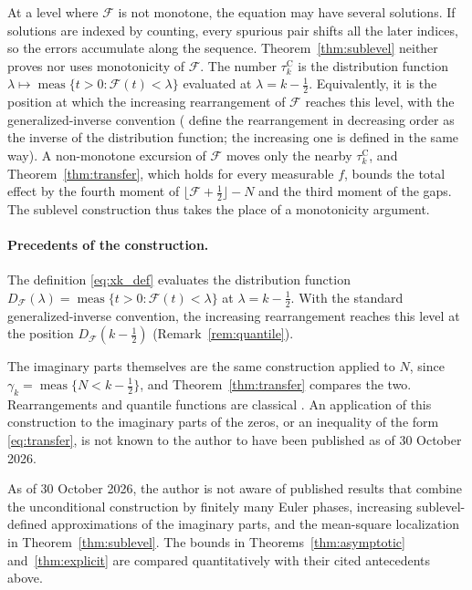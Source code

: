 \documentclass[11pt,a4paper]{article}
\makeatletter
\numberwithin{equation}{section}
\DeclareRobustCommand{\CGref}[1]{\ref{#1}}
\DeclareRobustCommand{\CGeqref}[1]{\eqref{#1}}
\DeclareRobustCommand{\CGcite}[2][]{\if\relax\detokenize{#1}\relax\cite{#2}\else\cite[#1]{#2}\fi}
\let\CG@origref\ref
\let\CG@origeqref\eqref
\newcommand{\CG@gettip}[1]{\@ifundefined{CGTip@#1}{#1}{\csname CGTip@#1\endcsname}}
\newcommand{\CG@getbib}[1]{\@ifundefined{CGBib@#1}{#1}{\csname CGBib@#1\endcsname}}
\DeclareRobustCommand{\CGref}[1]{\pdftooltip{\CG@origref{#1}}{\CG@gettip{#1}}}
\DeclareRobustCommand{\CGeqref}[1]{\pdftooltip{\CG@origeqref{#1}}{\CG@gettip{#1}}}
\DeclareRobustCommand{\CGcite}[2][]{\pdftooltip{\if\relax\detokenize{#1}\relax\cite{#2}\else\cite[#1]{#2}\fi}{\CG@getbib{#2}}}
\theoremstyle{definition}
\theoremstyle{remark}
\newcommand{\Fc}{\mathcal F}
\newcommand{\meas}{\operatorname{meas}}
\makeatother
\begin{document}
At a level where $\Fc$ is not monotone, the equation may have several solutions. If solutions are indexed by counting, every spurious pair shifts all the later indices, so the errors accumulate along the sequence. Theorem~\CGref{thm:sublevel} neither proves nor uses monotonicity of $\Fc$. The number $\tau_{k}^{\mathrm C}$ is the distribution function $\lambda\mapsto\meas\{t>0:\Fc(t)<\lambda\}$ evaluated at $\lambda=k-\frac12$. Equivalently, it is the position at which the increasing rearrangement of $\Fc$ reaches this level, with the generalized-inverse convention (\CGcite[\S10.12]{HardyLittlewoodPolya1934} define the rearrangement in decreasing order as the inverse of the distribution function; the increasing one is defined in the same way). A non-monotone excursion of $\Fc$ moves only the nearby $\tau_{k}^{\mathrm C}$, and Theorem~\CGref{thm:transfer}, which holds for every measurable $f$, bounds the total effect by the fourth moment of $\lfloor\Fc+\frac12\rfloor-N$ and the third moment of the gaps. The sublevel construction thus takes the place of a monotonicity argument.

\paragraph{Precedents of the construction.}
The definition \CGeqref{eq:xk_def} evaluates the distribution function $D_{\Fc}(\lambda)=\meas\{t>0:\Fc(t)<\lambda\}$ at $\lambda=k-\frac12$. With the standard generalized-inverse convention, the increasing rearrangement reaches this level at the position $D_{\Fc}(k-\frac12)$ (Remark~\CGref{rem:quantile}).

The imaginary parts themselves are the same construction applied to $N$, since $\gamma_k=\meas\{N<k-\frac12\}$, and Theorem~\CGref{thm:transfer} compares the two. Rearrangements and quantile functions are classical \CGcite[Ch.~X]{HardyLittlewoodPolya1934}. An application of this construction to the imaginary parts of the zeros, or an inequality of the form \CGeqref{eq:transfer}, is not known to the author to have been published as of 30 October 2026.

As of 30 October 2026, the author is not aware of published results that combine the unconditional construction by finitely many Euler phases, increasing sublevel-defined approximations of the imaginary parts, and the mean-square localization in Theorem~\CGref{thm:sublevel}. The bounds in Theorems~\CGref{thm:asymptotic} and~\CGref{thm:explicit} are compared quantitatively with their cited antecedents above.
\end{document}
